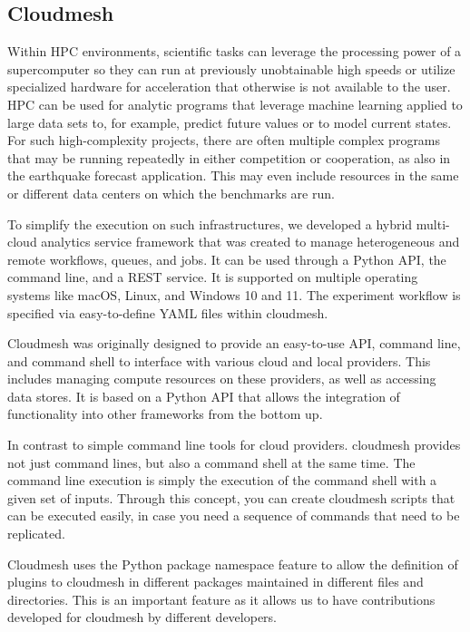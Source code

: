 \documentclass[utf8]{FrontiersinVancouver} %
\begin{document}
\subsection{Cloudmesh}


Within HPC environments, scientific tasks can leverage the processing power of a supercomputer so they can run at previously unobtainable high speeds or utilize specialized hardware for acceleration that otherwise is not available to the user. HPC can be used for analytic programs that leverage machine learning applied to large data sets to, for example, predict future values or to model current states. For such high-complexity projects, there are often multiple complex programs that may be running repeatedly in either competition or cooperation, as also in the earthquake forecast application.  This may even include resources in the same or different data centers on which the benchmarks are run. 

To simplify the execution on such infrastructures, we developed a hybrid multi-cloud analytics service framework that was created to manage heterogeneous and remote workflows, queues, and jobs.  It can be used through a Python API, the command line, and a REST service. It is supported on multiple operating systems like macOS, Linux, and Windows 10 and 11.  The experiment workflow is specified via easy-to-define YAML files within cloudmesh.  

Cloudmesh was originally designed to provide an easy-to-use API, command line, and command shell to interface with various cloud and local providers. This includes managing compute resources on these providers, as well as accessing data stores. It is based on a Python API that allows the integration of functionality into other frameworks from the bottom up. 

In contrast to simple command line tools for cloud providers. cloudmesh provides not just command lines, but also a command shell at the same time. The command line execution is simply the execution of the command shell with a given set of inputs. Through this concept, you can create cloudmesh scripts that can be executed easily, in case you need a sequence of commands that need to be replicated.

Cloudmesh uses the Python package namespace feature to allow the definition of plugins to cloudmesh in different packages maintained in different files and directories. This is an important feature as it allows us to have contributions developed for cloudmesh by different developers.
\end{document}
